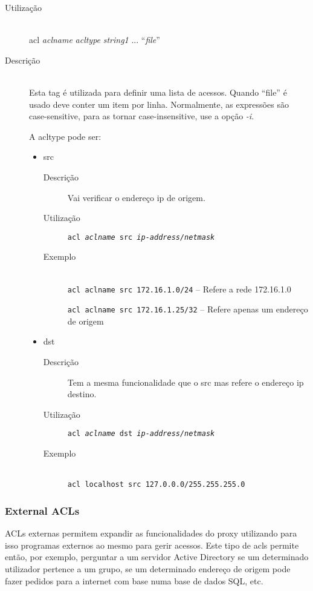 \begin{description}
\item[Utilização]~\\
acl \emph{aclname} \emph{acltype} \emph{string1} ... \textbar{} ``\emph{file}''

\item[Descrição]~\\
Esta tag é utilizada para definir uma lista de acessos.
Quando ``file'' é usado deve conter um item por linha.
Normalmente, as expressões são case-sensitive, para as tornar
case-insensitive, use a opção \emph{-i}.

A acltype pode ser:

\begin{itemize}
\item src
\begin{description}
\item[Descrição] Vai verificar o endereço ip de origem.

\item[Utilização] \texttt{acl \emph{aclname} src
\emph{ip-address/netmask}}

\item[Exemplo]~\\
\texttt{acl aclname src 172.16.1.0/24} -- Refere a rede 172.16.1.0

\texttt{acl aclname src 172.16.1.25/32} -- Refere apenas um endereço de
origem
\end{description}

\item dst
\begin{description}
\item[Descrição] Tem a mesma funcionalidade que o src mas
refere o endereço ip destino.

\item[Utilização] \texttt{acl \emph{aclname} dst
\emph{ip-address/netmask}}

\item[Exemplo]~\\
\texttt{acl localhost src 127.0.0.0/255.255.255.0}
\end{description}
\end{itemize}
\end{description}

\subsubsection{External ACLs}

ACLs externas permitem expandir as funcionalidades do proxy utilizando
para isso programas externos ao mesmo para gerir acessos.
Este tipo de acls permite então, por exemplo, perguntar a um servidor
Active Directory se um determinado utilizador pertence a um grupo, se
um determinado endereço de origem pode fazer pedidos para a internet
com base numa base de dados SQL, etc.

